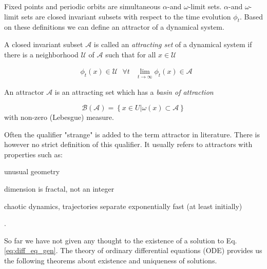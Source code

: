 Fixed points and periodic orbits are simultaneous $\alpha$-and $\omega$-limit sets.  $\alpha$-and $\omega$-limit sets are closed invariant subsets with respect to 
the time evolution $\phi_t$. Based on these definitions we can define an attractor of a dynamical system.

\begin{definition}[Attractor] A closed invariant subset $\mathcal{A}$ is called an \textit{attracting set} of a dynamical system if there is a neighborhood $\mathcal{U}$ 
    of $\mathcal{A}$ such that for all $x \in \mathcal{U}$

    \begin{align}
        &\phi_t(x) \in \mathcal{U} \text{ } \forall t  &\lim_{t\rightarrow \infty}\phi_t(x) \in \mathcal{A}
    \end{align}
    
    An attractor $\mathcal{A}$ is an attracting set which has a \textit{basin of attraction}

    \begin{equation}
        \mathcal{B}(\mathcal{A}) = \left\{ x \in U \vert \omega(x) \subset \mathcal{A} \right\}
    \end{equation}
    with non-zero (Lebesgue) measure.

    Often the qualifier "strange" is added to the term attractor in literature. There is however no strict definition of this qualifier. 
    It usually refers to attractors with properties such as: \begin{enumerate*}[label=(\roman*)] \item unusual geometry \item dimension is fractal, not an integer \item chaotic dynamics, 
    trajectories separate exponentially fast (at least initially)\end{enumerate*}.


\end{definition}

So far we have not given any thought to the existence of a solution to Eq. \ref{eq:diff_eq_gen}. The theory of ordinary differential equations (ODE) provides us the following
theorems about existence and uniqueness of solutions.

